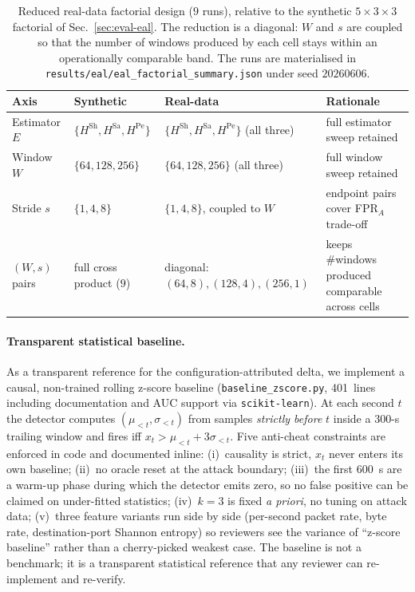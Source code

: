 \documentclass[runningheads]{llncs}
\newcommand{\Hsh}{\ensuremath{H^{\mathrm{Sh}}}}
\newcommand{\Hsa}{\ensuremath{H^{\mathrm{Sa}}}}
\newcommand{\Hpe}{\ensuremath{H^{\mathrm{Pe}}}}
\begin{document}
\begin{table}[t]
\centering
\caption{Reduced real-data factorial design ($9$ runs), relative to the
synthetic $5 \times 3 \times 3$ factorial of
Sec.~\ref{sec:eval-eal}. The reduction is a diagonal:
$W$ and $s$ are coupled so that the number of windows produced by
each cell stays within an operationally comparable band. The runs
are materialised in \texttt{results/eal/eal\_factorial\_summary.json}
under seed $20260606$.}
\label{tab:real-factorial}
\small
\begin{tabular}{@{}llll@{}}
\toprule
\textbf{Axis} & \textbf{Synthetic} & \textbf{Real-data} & \textbf{Rationale} \\
\midrule
Estimator $E$   & $\{\Hsh, \Hsa, \Hpe\}$    & $\{\Hsh, \Hsa, \Hpe\}$ (all three) & full estimator sweep retained \\
Window $W$      & $\{64, 128, 256\}$        & $\{64, 128, 256\}$ (all three)     & full window sweep retained \\
Stride $s$      & $\{1, 4, 8\}$             & $\{1, 4, 8\}$, coupled to $W$      & endpoint pairs cover FPR$_A$ trade-off \\
$(W, s)$ pairs  & full cross product ($9$)  & diagonal: $(64,8), (128,4), (256,1)$ & keeps \#windows produced comparable across cells \\
\bottomrule
\end{tabular}
\end{table}

\paragraph{Transparent statistical baseline.} As a transparent reference
for the configuration-attributed delta, we implement a causal,
non-trained rolling z-score baseline (\texttt{baseline\_zscore.py},
401~lines including documentation and AUC support via
\texttt{scikit-learn}). At each second $t$ the detector
computes $(\mu_{<t}, \sigma_{<t})$ from samples \emph{strictly before}
$t$ inside a $300$-s trailing window and fires iff
$x_t > \mu_{<t} + 3\sigma_{<t}$. Five anti-cheat constraints are enforced
in code and documented inline: (i)~causality is strict, $x_t$ never
enters its own baseline; (ii)~no oracle reset at the attack boundary;
(iii)~the first $600$~s are a warm-up phase during which the detector
emits zero, so no false positive can be claimed on under-fitted
statistics; (iv)~$k=3$ is fixed \emph{a priori}, no tuning on attack
data; (v)~three feature variants run side by side (per-second packet
rate, byte rate, destination-port Shannon entropy) so reviewers see the
variance of ``z-score baseline'' rather than a cherry-picked weakest
case. The baseline is not a benchmark; it is a transparent statistical
reference that any reviewer can re-implement and re-verify.
\end{document}
